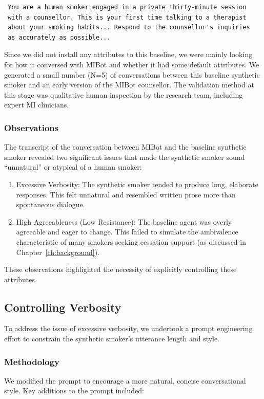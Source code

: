 \begin{verbatim}
 You are a human smoker engaged in a private thirty-minute session
 with a counsellor. This is your first time talking to a therapist
 about your smoking habits... Respond to the counsellor's inquiries
 as accurately as possible...
\end{verbatim}

Since we did not install any attributes to this baseline, we were mainly looking for how it conversed with MIBot and whether it had some default attributes. We generated a small number (N=5) of conversations between this baseline synthetic smoker and an early version of the MIBot counsellor. The validation method at this stage was qualitative human inspection by the research team, including expert MI clinicians.

\subsubsection{Observations}
The transcript of the conversation between MIBot and the baseline synthetic smoker revealed two significant issues that made the synthetic smoker sound ``unnatural'' or atypical of a human smoker:

\begin{enumerate}
    \item Excessive Verbosity: The synthetic smoker tended to produce long, elaborate responses. This felt unnatural and resembled written prose more than spontaneous dialogue.
    \item High Agreeableness (Low Resistance): The baseline agent was overly agreeable and eager to change. This failed to simulate the ambivalence characteristic of many smokers seeking cessation support (as discussed in Chapter~\ref{ch:background}).
\end{enumerate}

These observations highlighted the necessity of explicitly controlling these attributes.

\subsection{Controlling Verbosity}
\label{sec:synthetic-smoker-verbosity}

To address the issue of excessive verbosity, we undertook a prompt engineering effort to constrain the synthetic smoker's utterance length and style.

\subsubsection{Methodology}
We modified the prompt to encourage a more natural, concise conversational style. Key additions to the prompt included:

